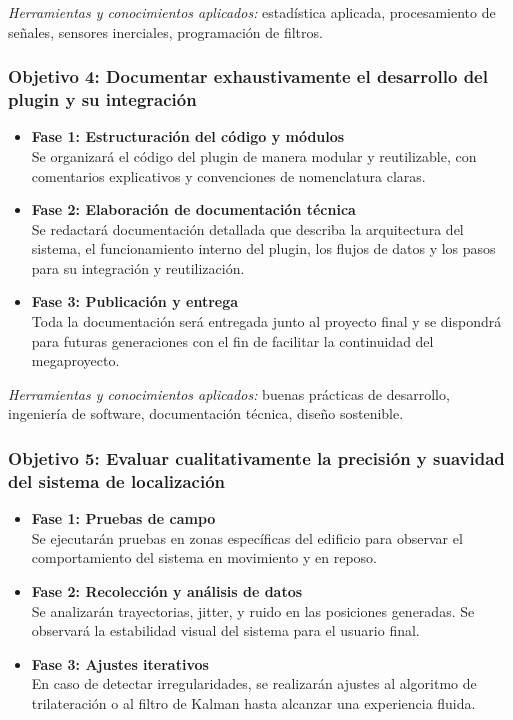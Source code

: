 \documentclass{article}
\begin{document}
\textit{Herramientas y conocimientos aplicados:} estadística aplicada, procesamiento de señales, sensores inerciales, programación de filtros.

\subsubsection{Objetivo 4: Documentar exhaustivamente el desarrollo del plugin y su integración}

\begin{itemize}
    \item \textbf{Fase 1: Estructuración del código y módulos} \\
    Se organizará el código del plugin de manera modular y reutilizable, con comentarios explicativos y convenciones de nomenclatura claras.

    \item \textbf{Fase 2: Elaboración de documentación técnica} \\
    Se redactará documentación detallada que describa la arquitectura del sistema, el funcionamiento interno del plugin, los flujos de datos y los pasos para su integración y reutilización.

    \item \textbf{Fase 3: Publicación y entrega} \\
    Toda la documentación será entregada junto al proyecto final y se dispondrá para futuras generaciones con el fin de facilitar la continuidad del megaproyecto.
\end{itemize}

\textit{Herramientas y conocimientos aplicados:} buenas prácticas de desarrollo, ingeniería de software, documentación técnica, diseño sostenible.

\subsubsection{Objetivo 5: Evaluar cualitativamente la precisión y suavidad del sistema de localización}

\begin{itemize}
    \item \textbf{Fase 1: Pruebas de campo} \\
    Se ejecutarán pruebas en zonas específicas del edificio para observar el comportamiento del sistema en movimiento y en reposo.

    \item \textbf{Fase 2: Recolección y análisis de datos} \\
    Se analizarán trayectorias, jitter, y ruido en las posiciones generadas. Se observará la estabilidad visual del sistema para el usuario final.

    \item \textbf{Fase 3: Ajustes iterativos} \\
    En caso de detectar irregularidades, se realizarán ajustes al algoritmo de trilateración o al filtro de Kalman hasta alcanzar una experiencia fluida.
\end{itemize}
\end{document}
